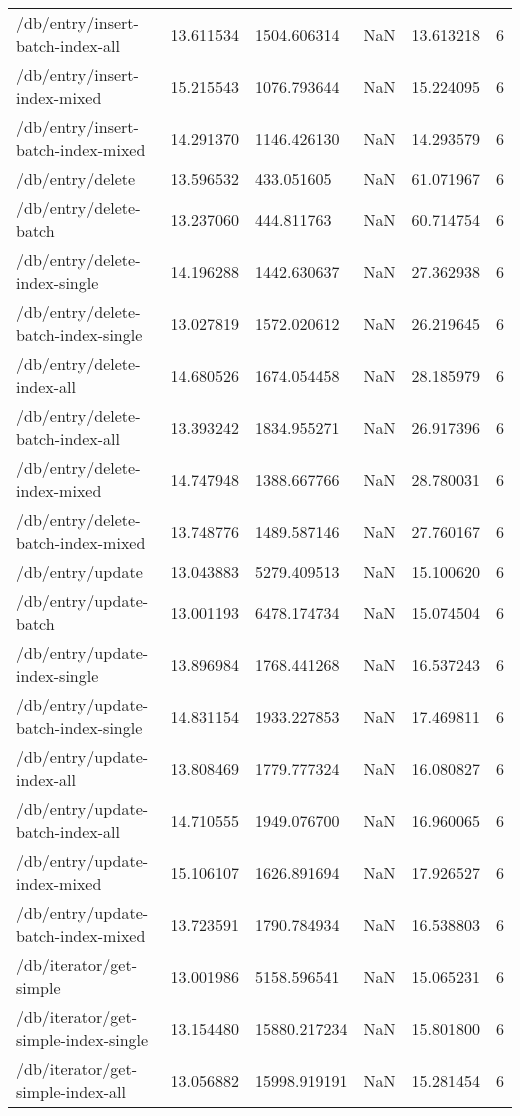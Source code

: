 \begin{tabularx}{\linewidth}{XXXXXX}
/db/entry/insert-batch-index-all & 13.611534 & 1504.606314 & NaN & 13.613218 & 6 \\
/db/entry/insert-index-mixed & 15.215543 & 1076.793644 & NaN & 15.224095 & 6 \\
/db/entry/insert-batch-index-mixed & 14.291370 & 1146.426130 & NaN & 14.293579 & 6 \\
/db/entry/delete & 13.596532 & 433.051605 & NaN & 61.071967 & 6 \\
/db/entry/delete-batch & 13.237060 & 444.811763 & NaN & 60.714754 & 6 \\
/db/entry/delete-index-single & 14.196288 & 1442.630637 & NaN & 27.362938 & 6 \\
/db/entry/delete-batch-index-single & 13.027819 & 1572.020612 & NaN & 26.219645 & 6 \\
/db/entry/delete-index-all & 14.680526 & 1674.054458 & NaN & 28.185979 & 6 \\
/db/entry/delete-batch-index-all & 13.393242 & 1834.955271 & NaN & 26.917396 & 6 \\
/db/entry/delete-index-mixed & 14.747948 & 1388.667766 & NaN & 28.780031 & 6 \\
/db/entry/delete-batch-index-mixed & 13.748776 & 1489.587146 & NaN & 27.760167 & 6 \\
/db/entry/update & 13.043883 & 5279.409513 & NaN & 15.100620 & 6 \\
/db/entry/update-batch & 13.001193 & 6478.174734 & NaN & 15.074504 & 6 \\
/db/entry/update-index-single & 13.896984 & 1768.441268 & NaN & 16.537243 & 6 \\
/db/entry/update-batch-index-single & 14.831154 & 1933.227853 & NaN & 17.469811 & 6 \\
/db/entry/update-index-all & 13.808469 & 1779.777324 & NaN & 16.080827 & 6 \\
/db/entry/update-batch-index-all & 14.710555 & 1949.076700 & NaN & 16.960065 & 6 \\
/db/entry/update-index-mixed & 15.106107 & 1626.891694 & NaN & 17.926527 & 6 \\
/db/entry/update-batch-index-mixed & 13.723591 & 1790.784934 & NaN & 16.538803 & 6 \\
/db/iterator/get-simple & 13.001986 & 5158.596541 & NaN & 15.065231 & 6 \\
/db/iterator/get-simple-index-single & 13.154480 & 15880.217234 & NaN & 15.801800 & 6 \\
/db/iterator/get-simple-index-all & 13.056882 & 15998.919191 & NaN & 15.281454 & 6 \\

\end{tabularx}
